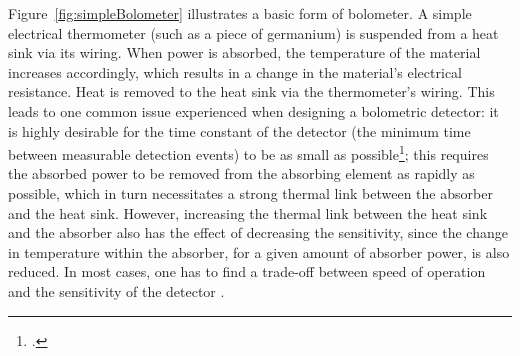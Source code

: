 Figure~\ref{fig:simpleBolometer} illustrates a basic form of bolometer. A simple electrical thermometer (such as a piece of germanium) is suspended from a heat sink via its wiring. When power is absorbed, the temperature of the material increases accordingly, which results in a change in the material's electrical resistance. Heat is removed to the heat sink via the thermometer's wiring. This leads to one common issue experienced when designing a bolometric detector: it is highly desirable for the time constant of the detector (the minimum time between measurable detection events) to be as small as possible\footcite[For example, see the discussion of the requirements for the \textit{SPIRIT} mission, as given by][]{Benford2004}; this requires the absorbed power to be removed from the absorbing element as rapidly as possible, which in turn necessitates a strong thermal link between the absorber and the heat sink. However, increasing the thermal link between the heat sink and the absorber also has the effect of decreasing the sensitivity, since the change in temperature within the absorber, for a given amount of absorber power, is also reduced. In most cases, one has to find a trade-off between speed of operation and the sensitivity of the detector \parencite[as discussed by][]{Griffin2003}. 

